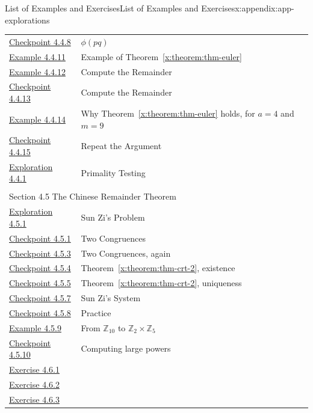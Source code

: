 \documentclass[oneside,10pt,]{book}
\newcommand{\xreffont}{\relax}
\numberwithin{equation}{section}
\begin{document}
\begin{appendixptx}{List of Examples and Exercises}{}{List of Examples and Exercises}{}{}{x:appendix:app-explorations}
\begin{longtable}[l]{ll}
\hyperref[x:exercise:ex-cong-euler-totient-prime-product]{Checkpoint 4.4.8}& \(\phi(pq)\)\\
\hyperref[x:example:eg-cong-euler-apply]{Example 4.4.11}& Example of Theorem~{\xreffont\ref*{x:theorem:thm-euler}}\\
\hyperref[x:example:eg-cong-euler-remainder]{Example 4.4.12}& Compute the Remainder\\
\hyperref[x:exercise:ex-cong-euler-remainder]{Checkpoint 4.4.13}& Compute the Remainder\\
\hyperref[x:example:eg-cong-euler-proof-example]{Example 4.4.14}& Why Theorem~{\xreffont\ref*{x:theorem:thm-euler}} holds, for \(a = 4\) and \(m = 9\)\\
\hyperref[x:exercise:ex-cong-euler-proof-example-again]{Checkpoint 4.4.15}& Repeat the Argument\\
\hyperref[x:exploration:expl-primality-testing]{Exploration 4.4.1}& Primality Testing\\
\multicolumn{2}{l}{\null}\\[1.5ex] \multicolumn{2}{l}{\large Section 4.5 The Chinese Remainder Theorem}\\[0.5ex]
\hyperref[x:exploration:expl-sunzi]{Exploration 4.5.1}& Sun Zi's Problem\\
\hyperref[x:exercise:ex-crt-small]{Checkpoint 4.5.1}& Two Congruences\\
\hyperref[x:exercise:ex-crt-small-again]{Checkpoint 4.5.3}& Two Congruences, again\\
\hyperref[x:exercise:ex-crt-2-prove-existence]{Checkpoint 4.5.4}& Theorem~{\xreffont\ref*{x:theorem:thm-crt-2}}, existence\\
\hyperref[x:exercise:ex-crt-2-prove-uniqueness]{Checkpoint 4.5.5}& Theorem~{\xreffont\ref*{x:theorem:thm-crt-2}}, uniqueness\\
\hyperref[x:exercise:ex-crt-sun-zi]{Checkpoint 4.5.7}& Sun Zi's System\\
\hyperref[x:exercise:ex-crt-n]{Checkpoint 4.5.8}& Practice\\
\hyperref[x:example:eg-crt-bijection]{Example 4.5.9}& From \(\mathbb{Z}_{10}\) to \(\mathbb{Z}_2 \times \mathbb{Z}_5\)\\
\hyperref[x:exercise:ex-crt-bijection-power]{Checkpoint 4.5.10}& Computing large powers\\
\hyperlink{g:exercise:id330592}{Exercise 4.6.1}& \\
\hyperlink{g:exercise:id330676}{Exercise 4.6.2}& \\
\hyperlink{g:exercise:id330844}{Exercise 4.6.3}& \\

\end{longtable}
\end{appendixptx}
\end{document}

